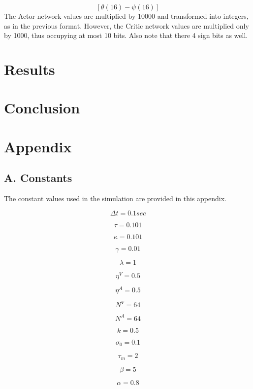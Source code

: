 \documentclass{article}
\begin{document}
\[
[\theta (16) - \psi (16)]
\]
The Actor network values are multiplied by 10000 and transformed into integers, as in the previous format. However, the Critic network values are multiplied only by 1000, thus occupying at most 10 bits. Also note that there 4 sign bits as well.


\section{Results}




\section{Conclusion}

\section{Appendix}
\subsection*{A. Constants}
The constant values used in the simulation are provided in this appendix.

\begin{multicols}{2}
\[ 
\Delta t = 0.1 sec
\]

\[
\tau = 0.101
\]

\[
\kappa = 0.101
\]

\[
\gamma = 0.01
\]

\[
\lambda = 1
\]

\[
\eta^{V} = 0.5
\]

\[
\eta^{A} = 0.5
\]

\[
N^{V} = 64
\]


\[
N^{A} = 64
\]

\[
k = 0.5
\]

\[
\sigma_{0} = 0.1
\]

\[
\tau_{m} = 2
\]

\[
\beta = 5
\]

\[ 
\alpha = 0.8
\]
\end{multicols}
\end{document}
